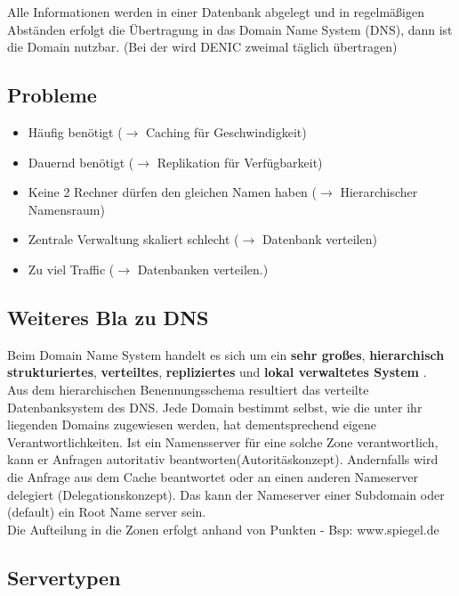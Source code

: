 \documentclass{article} %
\begin{document}
Alle Informationen werden in einer Datenbank abgelegt und in regelmäßigen Abständen erfolgt die Übertragung in das Domain Name System (DNS), dann ist die Domain nutzbar. (Bei der wird DENIC zweimal täglich übertragen)

\subsection{Probleme}
	\begin{itemize}
	\item Häufig benötigt ($\rightarrow$ Caching für Geschwindigkeit)
	\item Dauernd benötigt ($\rightarrow$ Replikation für Verfügbarkeit)
	\item Keine 2 Rechner dürfen den gleichen Namen haben ($\rightarrow$ Hierarchischer Namensraum)
	\item Zentrale Verwaltung skaliert schlecht ($\rightarrow$ Datenbank verteilen)
	\item Zu viel Traffic ($\rightarrow$ Datenbanken verteilen.)
	\end{itemize}

\subsection{Weiteres Bla zu DNS}

Beim Domain Name System handelt es sich um ein \textbf{sehr großes}, \textbf{hierarchisch strukturiertes}, \textbf{verteiltes}, \textbf{repliziertes} und \textbf{lokal verwaltetes System} \cite{rfc1034,rfc1035}.\\
Aus dem hierarchischen Benennungsschema resultiert das verteilte Datenbanksystem des DNS.
Jede Domain bestimmt selbst, wie die unter ihr liegenden Domains zugewiesen werden, hat dementsprechend eigene Verantwortlichkeiten.
Ist ein Namensserver für eine solche Zone verantwortlich, kann er Anfragen autoritativ beantworten(Autoritäskonzept).
Andernfalls wird die Anfrage aus dem Cache beantwortet oder an einen anderen Nameserver delegiert (Delegationskonzept).
Das kann der Nameserver einer Subdomain oder (default) ein Root Name server sein.\\
Die Aufteilung in die Zonen erfolgt anhand von Punkten - Bsp: www.spiegel.de

\subsection{Servertypen}
\end{document}
